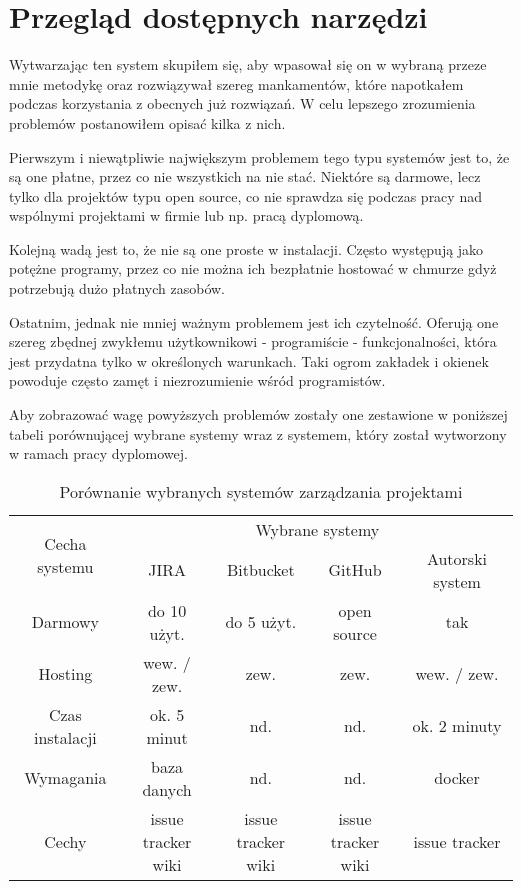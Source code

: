 \section{Przegląd dostępnych narzędzi}
Wytwarzając ten system skupiłem się, aby wpasował się on w wybraną przeze mnie metodykę oraz rozwiązywał szereg mankamentów, które napotkałem podczas korzystania z obecnych już rozwiązań. W celu lepszego zrozumienia problemów postanowiłem opisać kilka z nich.

Pierwszym i niewątpliwie największym problemem tego typu systemów jest to, że są one płatne, przez co nie wszystkich na nie stać. Niektóre są darmowe, lecz tylko dla projektów typu open source, co nie sprawdza się podczas pracy nad wspólnymi projektami w firmie lub np. pracą dyplomową.

Kolejną wadą jest to, że nie są one proste w instalacji. Często występują jako potężne programy, przez co nie można ich bezpłatnie hostować w chmurze gdyż potrzebują dużo płatnych zasobów. 

Ostatnim, jednak nie mniej ważnym problemem jest ich czytelność. Oferują one szereg zbędnej zwykłemu użytkownikowi - programiście - funkcjonalności, która jest przydatna tylko w określonych warunkach. Taki ogrom zakładek i okienek powoduje często zamęt i niezrozumienie wśród programistów.

Aby zobrazować wagę powyższych problemów zostały one zestawione w poniższej tabeli porównującej wybrane systemy wraz z systemem, który został wytworzony w ramach pracy dyplomowej.
\begin{table}[h!]
	\caption{Porównanie wybranych systemów zarządzania projektami}
	\centering
	\begin{tabular}{|c|c|c|c|c|}
		\hline
		\multirow{2}{*}{Cecha systemu} & \multicolumn{4}{c|}{Wybrane systemy} \\\cline{2-5} & JIRA & Bitbucket & GitHub & Autorski system\\
		\hline
		Darmowy & do 10 użyt. & do 5 użyt. & open source & tak\\
		\hline
		Hosting & wew. / zew. & zew. & zew. & wew. / zew.\\
		\hline
		Czas instalacji & ok. 5 minut & nd. & nd. & ok. 2 minuty\\
		\hline
		Wymagania & baza danych & nd. & nd. & docker\\
		\hline
		Cechy & \specialcell{issue tracker\\ wiki} & \specialcell{issue tracker\\ wiki} & \specialcell{issue tracker\\ wiki} & issue tracker\\
		\hline

	\end{tabular}
	\label{tabela:porownanie_systemow}
\end{table}


